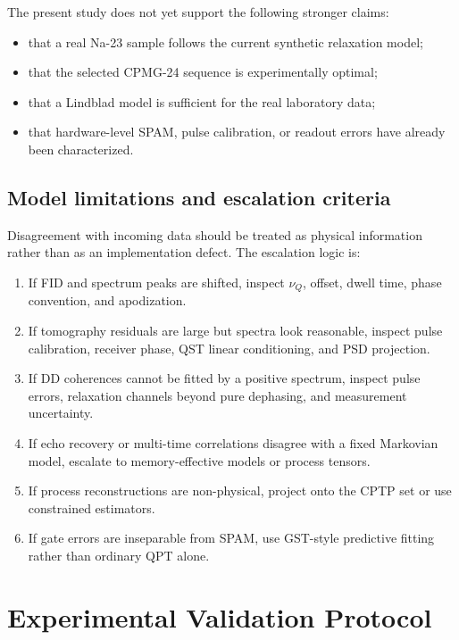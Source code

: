 \documentclass[11pt,a4paper]{article}
\begin{document}
The present study does not yet support the following stronger claims:
\begin{itemize}
  \item that a real Na-23 sample follows the current synthetic relaxation
  model;
  \item that the selected CPMG-24 sequence is experimentally optimal;
  \item that a Lindblad model is sufficient for the real laboratory data;
  \item that hardware-level SPAM, pulse calibration, or readout errors have
  already been characterized.
\end{itemize}

\subsection{Model limitations and escalation criteria}

Disagreement with incoming data should be treated as physical information rather
than as an implementation defect.  The escalation logic is:
\begin{enumerate}
  \item If FID and spectrum peaks are shifted, inspect $\nu_Q$, offset, dwell
  time, phase convention, and apodization.
  \item If tomography residuals are large but spectra look reasonable, inspect
  pulse calibration, receiver phase, QST linear conditioning, and PSD projection.
  \item If DD coherences cannot be fitted by a positive spectrum, inspect pulse
  errors, relaxation channels beyond pure dephasing, and measurement
  uncertainty.
  \item If echo recovery or multi-time correlations disagree with a fixed
  Markovian model, escalate to memory-effective models or process tensors.
  \item If process reconstructions are non-physical, project onto the CPTP set
  or use constrained estimators.
  \item If gate errors are inseparable from SPAM, use GST-style predictive
  fitting rather than ordinary QPT alone.
\end{enumerate}

\section{Experimental Validation Protocol}
\end{document}
